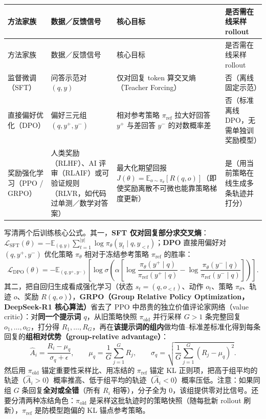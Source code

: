 \begingroup\small\setlength{\tabcolsep}{3pt}\renewcommand{\arraystretch}{1.22}
\begin{longtable}{@{}>{\raggedright\arraybackslash}p{}>{\raggedright\arraybackslash}p{}>{\raggedright\arraybackslash}p{}>{\raggedright\arraybackslash}p{}@{}}
\toprule
方法家族 & 数据／反馈信号 & 核心目标 & 是否需在线采样 rollout \\
\midrule\endfirsthead
方法家族 & 数据／反馈信号 & 核心目标 & 是否需在线采样 rollout \\
\midrule\endhead
\bottomrule\endfoot
监督微调（SFT） & 问答示范对 $(q,y)$ & 仅对回复 token 算交叉熵（Teacher Forcing） & 否（离线固定示范） \\
直接偏好优化（DPO） & 偏好三元组 $(q, y^+, y^-)$ & 相对参考策略 $\pi_{\text{ref}}$ 拉大好回答 $y^+$ 与差回答 $y^-$ 的对数概率差 & 否（标准离线 DPO，无需单独训奖励模型） \\
奖励强化学习（PPO / GRPO） & 人类奖励（RLHF）、AI 评审（RLAIF）或可验证规则（RLVR，如代码过单测／数学对答案） & 最大化期望回报 $J(\theta)=\mathbb{E}_{o\sim\pi_\theta}[R(q,o)]$（即使奖励离散不可微也能靠策略梯度更新） & 是（用当前策略在线生成多条轨迹并打分） \\
\end{longtable}\endgroup

写清两个后训练核心公式。其一，\textbf{SFT 仅对回复部分求交叉熵}：$\mathcal{L}_{\text{SFT}}(\theta) = -\mathbb{E}_{(q,y)}\sum_{t=1}^{|y|}\log\pi_\theta(y_t\mid q, y_{<t})$；\textbf{DPO} 直接用偏好对 $(q,y^+,y^-)$ 优化策略 $\pi_\theta$ 相对于冻结参考策略 $\pi_{\text{ref}}$ 的胜率：
\[
\mathcal{L}_{\text{DPO}}(\theta) = -\mathbb{E}_{(q,y^+,y^-)}\!\left[\log\sigma\!\left(\alpha\left[\log\frac{\pi_\theta(y^+\mid q)}{\pi_{\text{ref}}(y^+\mid q)} - \log\frac{\pi_\theta(y^-\mid q)}{\pi_{\text{ref}}(y^-\mid q)}\right]\right)\right].
\tag{11.4}
\]
其二，把自回归生成看成强化学习（状态 $s_t=(q,o_{<t})$、动作 $o_t$、策略 $\pi_\theta$、轨迹 $o$、奖励 $R(q,o)$），\textbf{GRPO（Group Relative Policy Optimization，DeepSeek-R1 核心算法）}省去了 PPO 中昂贵的独立价值评论家网络（value critic）：对\textbf{同一个提示词 $q$}，从旧策略快照 $\pi_{\text{old}}$ 并行采样 $G>1$ 条完整回复 $o_1,\dots,o_G$，打分得 $R_1,\dots,R_G$，再在\textbf{该提示词的组内}做均值–标准差标准化得到每条回复的\textbf{组相对优势（group-relative advantage）}：
\[
\hat{A}_i = \frac{R_i - \mu_q}{\sigma_q + \epsilon}, \qquad
\mu_q = \frac{1}{G}\sum_{j=1}^G R_j, \qquad
\sigma_q = \sqrt{\frac{1}{G}\sum_{j=1}^G (R_j - \mu_q)^2}.
\tag{11.5}
\]
然后用 $\pi_{\text{old}}$ 锚定重要性采样比、用冻结的 $\pi_{\text{ref}}$ 锚定 KL 正则项，把高于组平均的轨迹（$\hat{A}_i>0$）概率推高、低于组平均的轨迹（$\hat{A}_i<0$）概率压低。注意：如果同组 $G$ 条回复\textbf{全对或全错}（所有 $R_i$ 相等），分子全为 0，该组提供零对比信号。还要分清两种冻结角色：$\pi_{\text{old}}$ 是采样这批轨迹时的策略快照（随每批新 rollout 刷新），$\pi_{\text{ref}}$ 是防模型跑偏的 KL 锚点参考策略。

